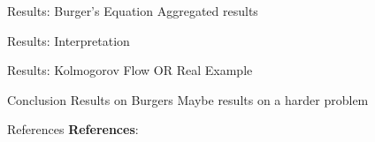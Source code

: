 \documentclass[8pt]{beamer}
\begin{document}
\begin{frame}{Results: Burger's Equation}
	Aggregated results
\end{frame}

\begin{frame}{Results: Interpretation}
	
\end{frame}

\begin{frame}{Results: Kolmogorov Flow OR Real Example}
\end{frame}

\begin{frame}{Conclusion}
	Results on Burgers
	Maybe results on a harder problem
\end{frame}


\begin{frame}{References}
	\textbf{References}: 
	
	
\end{frame}
\end{document}
